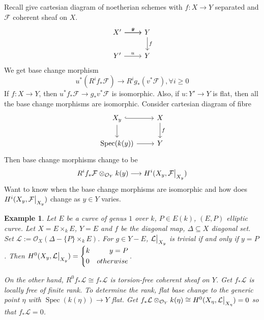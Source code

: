 \documentclass{ctexart}
\newtheorem{example}{Example}[section]
\newcommand{\spec}{\operatorname{Spec}}
\begin{document}
Recall give cartesian diagram of noetherian schemes with $f: X \longrightarrow Y$ separated and $\mathcal{F}$ coherent sheaf on $X$.
\begin{equation*}
    \begin{tikzcd}
        X' \arrow[r, "v"] \arrow[r, "g"] &
        Y \arrow[d, "f"] \\
        Y' \arrow[r, "u"] &
        Y
    \end{tikzcd}
\end{equation*}
We get base change morphism 
\begin{equation*}
    u^{\ast}(R^{i}f_{\ast}\mathcal{F}) \longrightarrow R^{i}g_{\ast}(v^{\ast}\mathcal{F}), \forall i \ge 0
\end{equation*}
If $f: X \longrightarrow Y$, then $u^{\ast}f_{\ast}\mathcal{F} \longrightarrow g_{\ast}v^{\ast}\mathcal{F}$ is isomorphic.
Also, if $u: Y' \longrightarrow Y$ is flat, then all the base change morphisms are isomorphic.
Consider cartesian diagram of fibre
\begin{equation*}
    \begin{tikzcd}
        X_{y} \arrow[r, hookrightarrow] \arrow[d] &
        X \arrow[d, "f"] \\
        \spec(k(y)) \arrow[r] &
        Y
    \end{tikzcd}
\end{equation*}
Then base change morphisms change to be 
\begin{equation*}
    R^{i}f_{\ast}\mathcal{F} \otimes_{\mathcal{O}_{Y}} k(y) \longrightarrow H^{i}(X_{y}, \mathcal{F}\big{|}_{X_{y}})
\end{equation*}
Want to know when the base change morphisms are isomorphic and how does $H^{i}(X_{y}, \mathcal{F}\big{|}_{X_{y}})$ change as $y\in Y$ varies.
\begin{example}
    Let $E$ be a curve of genus $1$ over $k$, $P\in E(k)$, $(E, P)$ elliptic curve.
    Let $X = E \times_{k} E$, $Y = E$ and $f$ be the diagonal map, $\Delta \subseteq X$ diagonal set.
    Set $\mathcal{L} := \mathcal{O}_{X}(\Delta -\{P\} \times_{k} E)$.
    For $g\in Y - E$, $\mathcal{L}\big{|}_{X_{y}}$ is trivial if and only if $y = P$.
    Then $H^{0}(X_{y}, \mathcal{L}\big{|}_{X_{y}}) =
    \left\{
        \begin{aligned}
            & k & y = P \\
            & 0 & otherwise
        \end{aligned}
    \right.$.
    \par
    On the other hand, $R^{0}f_{\ast}\mathcal{L} \cong f_{\ast}\mathcal{L}$ is torsion-free coherent sheaf on $Y$.
    Get $f_{\ast}\mathcal{L}$ is locally free of finite rank.
    To determine the rank, flat base change to the generic point $\eta$ with $\spec(k(\eta)) \longrightarrow Y$ flat.
    Get $f_{\ast}\mathcal{L} \otimes_{\mathcal{O}_{Y}} k(\eta) \cong H^{0}(X_{\eta}, \mathcal{L}\big{|}_{X_{\eta}}) = 0$ so that $f_{\ast}\mathcal{L} = 0$. 
\end{example}
\end{document}
